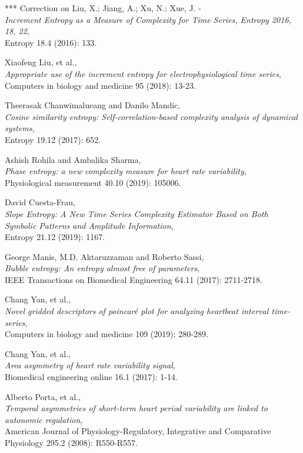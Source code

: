 \documentclass[12pt, a4paper, titlepage, openany]{book}
\begin{document}
\begin{thebibliography}{9}
***  Correction on Liu, X.; Jiang, A.; Xu, N.; Xue, J. -\\
\emph{Increment Entropy as a Measure of Complexity for Time Series,  Entropy 2016, 18, 22},\\
Entropy 18.4 (2016): 133.

Xiaofeng Liu, et al.,\\
\emph{Appropriate use of the increment entropy for electrophysiological time series},\\
Computers in biology and medicine 95 (2018): 13-23.

Theerasak Chanwimalueang and Danilo Mandic,\\
\emph{Cosine similarity entropy: Self-correlation-based complexity analysis of dynamical systems},\\
Entropy 19.12 (2017): 652.

Ashish Rohila and Ambalika Sharma,\\
\emph{Phase entropy: a new complexity measure for heart rate  variability},\\
Physiological measurement 40.10 (2019): 105006.

David Cuesta-Frau,\\
\emph{Slope Entropy: A New Time Series Complexity Estimator Based on Both Symbolic Patterns and Amplitude Information},\\
Entropy 21.12 (2019): 1167.

George Manis, M.D. Aktaruzzaman and Roberto Sassi,\\
\emph{Bubble entropy: An entropy almost free of parameters},\\
IEEE Transactions on Biomedical Engineering  64.11 (2017): 2711-2718.

Chang Yan, et al.,\\
\emph{Novel gridded descriptors of poincaré plot for analyzing heartbeat interval time-series},\\
Computers in biology and medicine 109 (2019): 280-289.

Chang Yan, et al., \\
\emph{Area asymmetry of heart rate variability signal},\\
Biomedical engineering online 16.1 (2017): 1-14.

Alberto Porta, et al.,\\
\emph{Temporal asymmetries of short-term heart period variability are linked to autonomic regulation},\\
American Journal of Physiology-Regulatory, Integrative and Comparative Physiology 295.2 (2008): R550-R557.


\end{thebibliography}
\end{document}
